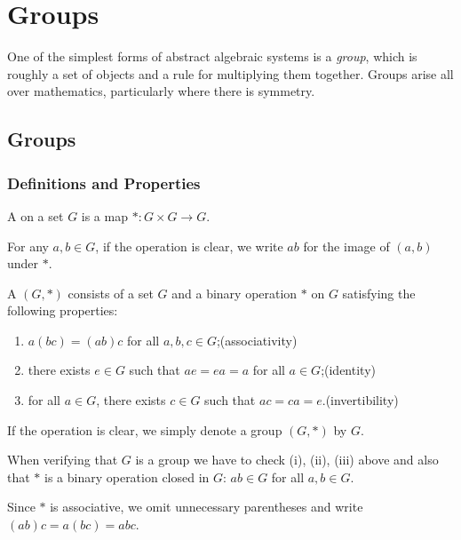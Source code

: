 \chapter{Groups}\label{chap:groups}
One of the simplest forms of abstract algebraic systems is a \emph{group}, which is roughly a set of objects and a rule for multiplying them together. 
Groups arise all over mathematics, particularly where there is symmetry.

\section{Groups}
\subsection{Definitions and Properties}
A  on a set $G$ is a map $\ast\colon G\times G\to G$. 

\begin{notation}
For any $a,b\in G$, if the operation is clear, we write $ab$ for the image of $(a,b)$ under $\ast$.
\end{notation}

\begin{definition}[Group]
A  $(G,\ast)$ consists of a set $G$ and a binary operation $\ast$ on $G$ satisfying the following properties:
\begin{enumerate}[label=(\roman*)]
\item $a(bc)=(ab)c$ for all $a,b,c\in G$;\hfill(associativity)
\item there exists $e\in G$ such that $ae=ea=a$ for all $a\in G$;\hfill(identity)
\item for all $a\in G$, there exists $c\in G$ such that $ac=ca=e$.\hfill(invertibility)
\end{enumerate}
\end{definition}

\begin{notation}
If the operation is clear, we simply denote a group $(G,\ast)$ by $G$.
\end{notation}

\begin{remark}
When verifying that $G$ is a group we have to check (i), (ii), (iii) above and also that $\ast$ is a binary operation closed in $G$: $ab\in G$ for all $a,b\in G$.
\end{remark}

\begin{notation}
Since $\ast$ is associative, we omit unnecessary parentheses and write $(ab)c=a(bc)=abc$.
\end{notation}

